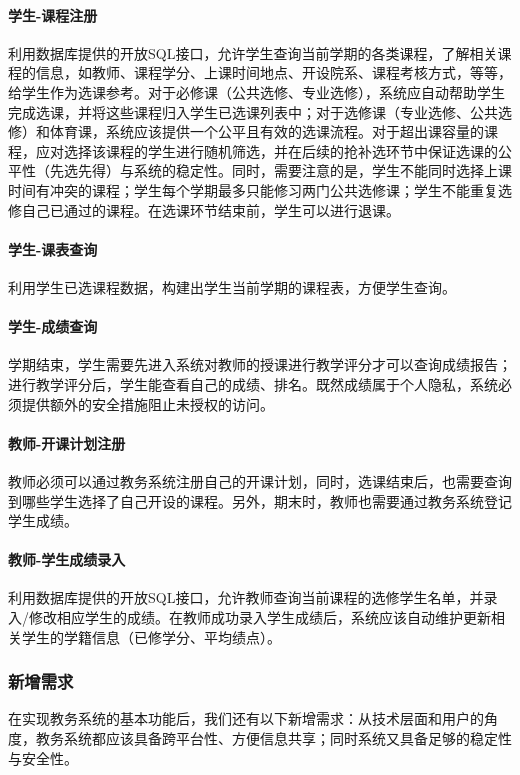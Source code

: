 \paragraph{学生-课程注册}

利用数据库提供的开放SQL接口，允许学生查询当前学期的各类课程，了解相关课程的信息，如教师、课程学分、上课时间地点、开设院系、课程考核方式，等等，给学生作为选课参考。对于必修课（公共选修、专业选修），系统应自动帮助学生完成选课，并将这些课程归入学生已选课列表中；对于选修课（专业选修、公共选修）和体育课，系统应该提供一个公平且有效的选课流程。对于超出课容量的课程，应对选择该课程的学生进行随机筛选，并在后续的抢补选环节中保证选课的公平性（先选先得）与系统的稳定性。同时，需要注意的是，学生不能同时选择上课时间有冲突的课程；学生每个学期最多只能修习两门公共选修课；学生不能重复选修自己已通过的课程。在选课环节结束前，学生可以进行退课。

\paragraph{学生-课表查询}
  
利用学生已选课程数据，构建出学生当前学期的课程表，方便学生查询。

\paragraph{学生-成绩查询}
  
学期结束，学生需要先进入系统对教师的授课进行教学评分才可以查询成绩报告；进行教学评分后，学生能查看自己的成绩、排名。既然成绩属于个人隐私，系统必须提供额外的安全措施阻止未授权的访问。

\paragraph{教师-开课计划注册}
  
教师必须可以通过教务系统注册自己的开课计划，同时，选课结束后，也需要查询到哪些学生选择了自己开设的课程。另外，期末时，教师也需要通过教务系统登记学生成绩。
  
\paragraph{教师-学生成绩录入}
  
利用数据库提供的开放SQL接口，允许教师查询当前课程的选修学生名单，并录入/修改相应学生的成绩。在教师成功录入学生成绩后，系统应该自动维护更新相关学生的学籍信息（已修学分、平均绩点）。

\subsubsection{新增需求}
在实现教务系统的基本功能后，我们还有以下新增需求：从技术层面和用户的角度，教务系统都应该具备跨平台性、方便信息共享；同时系统又具备足够的稳定性与安全性。

